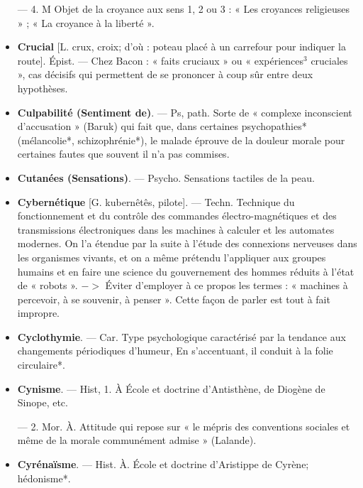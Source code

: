 \begin{itemize}[leftmargin=1cm, label=, itemsep=11pt]
— 4. M Objet de la croyance aux
sens 1, 2 ou 3 : « Les croyances religieuses » ; « La croyance à la liberté ».

\item {\bf Crucial} [L. crux, croix; d’où : poteau
placé à un carrefour pour indiquer
la route]. Épist. — Chez Bacon :
« faits cruciaux » ou « expériences$^3$
cruciales », cas décisifs qui permettent de se prononcer à coup sûr entre
deux hypothèses.

\item {\bf Culpabilité (Sentiment de)}. — Ps,
path. Sorte de « complexe inconscient
d’accusation » (Baruk) qui fait que,
dans certaines psychopathies* (mélancolie*, schizophrénie*), le malade
éprouve de la douleur morale pour
certaines fautes que souvent il n’a
pas commises.

\item {\bf Cutanées (Sensations)}. — Psycho. Sensations tactiles de la peau.

\item {\bf Cybernétique} [G. kubernêtês, pilote]. —
Techn. Technique du fonctionnement et du contrôle des commandes
électro-magnétiques et des transmissions électroniques dans les machines à calculer et les automates
modernes. On l’a étendue par la suite
à l’étude des connexions nerveuses
dans les organismes vivants, et on a
même prétendu l'appliquer aux
groupes humains et en faire une
science du gouvernement des hommes réduits à l’état de « robots ».
$->$ Éviter d'employer à ce propos
les termes : « machines à percevoir,
à se souvenir, à penser ». Cette façon
de parler est tout à fait impropre.

\item {\bf Cyclothymie}. — Car. Type psychologique caractérisé par la tendance
aux changements périodiques d’humeur, En s’accentuant, il conduit à
la folie circulaire*.

\item {\bf Cynisme}. — Hist, 1. À École et doctrine d’Antisthène, de Diogène de
Sinope, etc.

— 2. Mor. À. Attitude qui repose
sur « le mépris des conventions sociales et même de la morale communément admise » (Lalande).

\item {\bf Cyrénaïsme}. — Hist. À. École et doctrine d’Aristippe de Cyrène; hédonisme*.

	\end{itemize}
